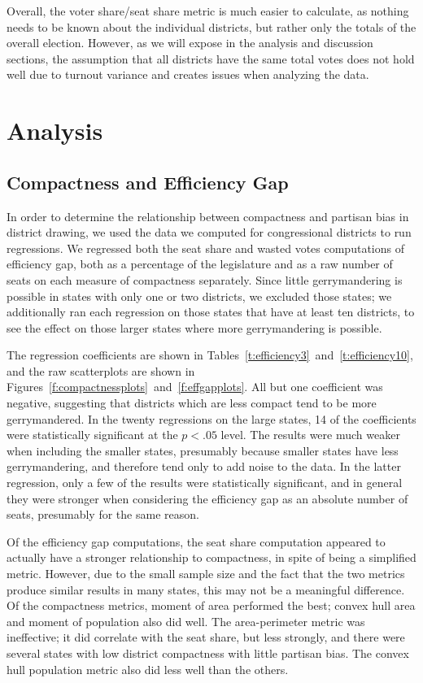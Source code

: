 \documentclass[12pt]{article}
\begin{document}
  Overall, the voter share/seat share metric is much easier to calculate, as nothing needs to be known about the individual districts, but rather only the totals of the overall election.  However, as we will expose in the analysis and discussion sections, the assumption that all districts have the same total votes does not hold well due to turnout variance and creates issues when analyzing the data.


  \section{Analysis}\label{s:analysis}

  \subsection{Compactness and Efficiency Gap}

  In order to determine the relationship between compactness and partisan bias in district drawing, we used the data we computed for congressional districts to run regressions.  We regressed both the seat share and wasted votes computations of efficiency gap, both as a percentage of the legislature and as a raw number of seats on each measure of compactness separately.  Since little gerrymandering is possible in states with only one or two districts, we excluded those states; we additionally ran each regression on those states that have at least ten districts, to see the effect on those larger states where more gerrymandering is possible.

  The regression coefficients are shown in Tables~\ref{t:efficiency3}~and~\ref{t:efficiency10}, and the raw scatterplots are shown in Figures~\ref{f:compactnessplots}~and~\ref{f:effgapplots}.  All but one coefficient was negative, suggesting that districts which are less compact tend to be more gerrymandered.  In the twenty regressions on the large states, 14 of the coefficients were statistically significant at the $p<.05$ level.  The results were much weaker when including the smaller states, presumably because smaller states have less gerrymandering, and therefore tend only to add noise to the data.  In the latter regression, only a few of the results were statistically significant, and in general they were stronger when considering the efficiency gap as an absolute number of seats, presumably for the same reason.

  Of the efficiency gap computations, the seat share computation appeared to actually have a stronger relationship to compactness, in spite of being a simplified metric.  However, due to the small sample size and the fact that the two metrics produce similar results in many states, this may not be a meaningful difference.  Of the compactness metrics, moment of area performed the best; convex hull area and moment of population also did well.  The area-perimeter metric was ineffective; it did correlate with the seat share, but less strongly, and there were several states with low district compactness with little partisan bias.  The convex hull population metric also did less well than the others.
\end{document}
